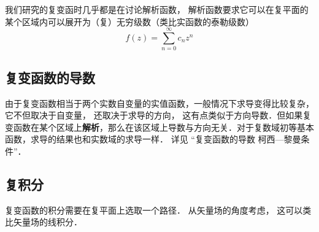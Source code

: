 我们研究的复变函时几乎都是在讨论解析函数， 解析函数要求它可以在复平面的某个区域内可以展开为（复）无穷级数（类比实函数的泰勒级数）
\begin{equation}
f(z) = \sum_{n=0}^\infty c_n z^n
\end{equation}

\subsection{复变函数的导数}
由于复变函数相当于两个实数自变量的实值函数，一般情况下求导变得比较复杂， 它不但取决于自变量， 还取决于求导的方向， 这有点类似于方向导数．但如果复变函数在某个区域上\textbf{解析}，那么在该区域上导数与方向无关．对于复数域初等基本函数，求导的结果也和实数域的求导一样． 详见 “复变函数的导数 柯西—黎曼条件”．

\subsection{复积分}
复变函数的积分需要在复平面上选取一个路径． 从矢量场的角度考虑， 这可以类比矢量场的线积分．
